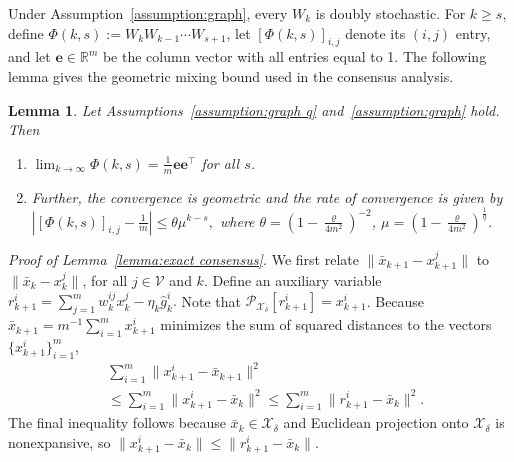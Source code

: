 \documentclass[twocolumn]{autart}    %
\newtheorem{lemma}{Lemma}
\newcommand{\1}{\mathbf{1}}
\begin{document}
Under Assumption~\ref{assumption:graph}, every $W_k$ is doubly stochastic. For $k\ge s$, define $\Phi(k,s):=W_kW_{k-1}\cdots W_{s+1}$, let $[\Phi(k,s)]_{i,j}$ denote its $(i,j)$ entry, and let $\bm e\in\mathbb R^m$ be the column vector with all entries equal to 1. The following lemma gives the geometric mixing bound used in the consensus analysis.
\begin{lemma}\cite[Lemma 3.2]{nedic2008distributed}
\label{lemma:graph}
Let Assumptions~\ref{assumption:graph q} and~\ref{assumption:graph} hold. Then
\begin{enumerate}
    \item $\lim_{k \to \infty} \Phi(k, s) = \frac{1}{m} \bm{e}\bm{e}^\top$ for all $s $.
    \item \textit{Further, the convergence is geometric and the rate of convergence is given by}
    $
    \left| [\Phi(k, s)]_{i,j} - \frac{1}{m} \right| \leq \theta \mu^{k-s}, 
    $ where  
    $
    \theta = \left( 1 - \frac{\varrho}{4m^2} \right)^{-2}$, $\mu = \left( 1 - \frac{\varrho}{4m^2} \right)^{\frac{1}{q}}.
    $
\end{enumerate}
\end{lemma}


%
%
%
%
%
%
%
%
\noindent\textit{Proof of Lemma~\ref{lemma:exact consensus}.} 
\label{app:decision convergence}
We first relate $\|\bar{x}_{k+1}-x_{k+1}^j\|$ to $\|\bar{x}_k-x_k^j\|$, for all $j\in\mathcal{V}$ and $k$.
Define an auxiliary variable 
$r_{k+1}^i = \sum_{j=1}^m w_k^{ij}x_k^j - \eta_{k} \hat{g}_{k}^i.$
Note that $\mathcal{P}_{\mathcal{X}_\delta}[r_{k+1}^i] = x_{k+1}^i$. 
Because $\bar x_{k+1}=m^{-1}\sum_{i=1}^m x_{k+1}^i$ minimizes the sum of squared distances to the vectors $\{x_{k+1}^i\}_{i=1}^m$,
\begin{align}\label{eq:x_k+1 <= r_k+1}
&\sum_{i=1}^m \|x_{k+1}^i - \bar{x}_{k+1}\|^2 \nonumber \\
&\leq \sum_{i=1}^m \|x_{k+1}^i - \bar{x}_k\|^2 \le \sum_{i=1}^m \|r_{k+1}^i - \bar{x}_k\|^2.
\end{align}
The final inequality follows because $\bar x_k\in\mathcal X_\delta$ and Euclidean projection onto $\mathcal X_\delta$ is nonexpansive, so $\|x_{k+1}^i-\bar x_k\|\le\|r_{k+1}^i-\bar x_k\|$.
 
\end{document}

